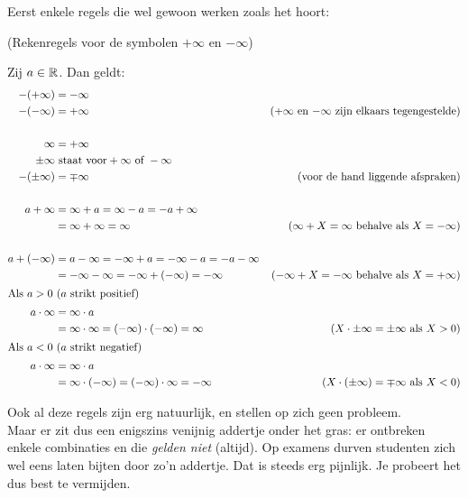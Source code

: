 \documentclass[numbers]{ximera}
\begin{document}
Eerst enkele regels die wel gewoon werken zoals het hoort:
\begin{proposition} (Rekenregels voor de symbolen $+\infty$ en $-\infty$)
	
Zij $a\in\mathbb{R}$. Dan geldt:	
	\begin{align*}
	-(+\infty) & = -\infty \\
	-(-\infty) & = +\infty  & \text{($+\infty$ en $-\infty$ zijn elkaars tegengestelde)}\\ 
	\\
		\infty & = +\infty   \\
		\pm\infty &\text{ staat voor} +\infty \text{ of } -\infty \\
		-(\pm\infty) &= \mp\infty &\text{(voor de hand liggende afspraken)} \\
	\\
	a+\infty & = \infty+a = \infty - a = -a +\infty \\
	         & = \infty + \infty = \infty & \text{($\infty + X =\infty$ behalve als $X=-\infty$)} \\
	\\
	a+(-\infty) & = a-\infty = -\infty+a =-\infty - a = -a - \infty \\
	         & = -\infty - \infty = -\infty+(-\infty) = -\infty & \text{($-\infty+X=-\infty$ behalve als $X=+\infty$)} \\
\intertext{Als $a>0$ ($a$ strikt positief)}	         
	a\cdot\infty & = \infty\cdot a \\
& = \infty \cdot \infty = (-\infty) \cdot (-\infty) = \infty & \text{($X\cdot\pm\infty=\pm\infty$ als $X>0$)} \\
\intertext{Als $a<0$ ($a$ strikt negatief)}	         
a\cdot\infty & = \infty\cdot a \\
& = \infty \cdot (-\infty) = (-\infty)\cdot\infty = -\infty & \text{($X\cdot(\pm\infty) = \mp\infty$ als $X<0$)} \\
	\end{align*}	
\end{proposition}  

Ook al deze regels zijn erg natuurlijk, en stellen op zich geen probleem. \\
Maar er zit dus een enigszins venijnig addertje onder het gras: er ontbreken enkele combinaties en die \textit{gelden niet} (altijd). Op examens durven studenten zich wel eens laten bijten door zo'n addertje. Dat is steeds erg pijnlijk. Je probeert het dus best te vermijden.
\end{document}
